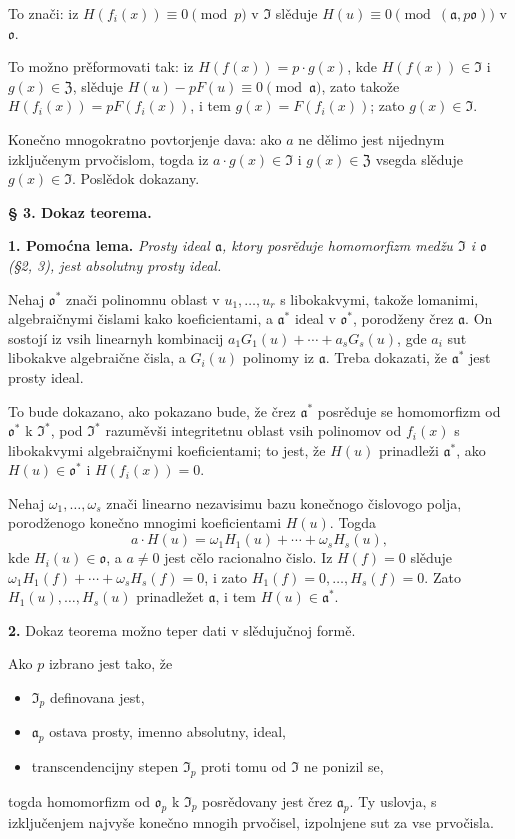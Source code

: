 \documentclass[11pt]{article}
\begin{document}
To znači: iz \(H(f_i(x))\equiv0\pmod p\) v \(\mathfrak{I}\) slěduje \(H(u)\equiv0\pmod{(\mathfrak{a},p\mathfrak{o})}\) v \(\mathfrak{o}\).

To možno prěformovati tak: iz \(H(f(x))=p\cdot g(x)\), kde \(H(f(x))\in\mathfrak{I}\) i \(g(x)\in\mathfrak{Z}\), slěduje \(H(u)-pF(u)\equiv0\pmod{\mathfrak{a}}\), zato takože \(H(f_i(x))=pF(f_i(x))\), i tem \(g(x)=F(f_i(x))\); zato \(g(x)\in\mathfrak{I}\).

Konečno mnogokratno povtorjenje dava: ako \(a\) ne dělimo jest nijednym izključenym prvočislom, togda iz \(a\cdot g(x)\in\mathfrak{I}\) i \(g(x)\in\mathfrak{Z}\) vsegda slěduje \(g(x)\in\mathfrak{I}\). Poslědok dokazany.

\bigskip
\noindent\textbf{§ 3. Dokaz teorema.}

\smallskip
\noindent\textbf{1. Pomoćna lema.}
\textit{Prosty ideal \(\mathfrak{a}\), ktory posrěduje homomorfizm medžu \(\mathfrak{I}\) i \(\mathfrak{o}\) (§2, 3), jest absolutny prosty ideal.}

Nehaj \(\mathfrak{o}^*\) znači polinomnu oblast v \(u_1,\ldots,u_r\) s libokakvymi, takože lomanimi, algebraičnymi čislami kako koeficientami, a \(\mathfrak{a}^*\) ideal v \(\mathfrak{o}^*\), porodženy črez \(\mathfrak{a}\). On sostojí iz vsih linearnyh kombinacij \(a_1G_1(u)+\cdots+a_sG_s(u)\), gde \(a_i\) sut libokakve algebraične čisla, a \(G_i(u)\) polinomy iz \(\mathfrak{a}\). Treba dokazati, že \(\mathfrak{a}^*\) jest prosty ideal.

To bude dokazano, ako pokazano bude, že črez \(\mathfrak{a}^*\) posrěduje se homomorfizm od \(\mathfrak{o}^*\) k \(\mathfrak{I}^*\), pod \(\mathfrak{I}^*\) razuměvši integritetnu oblast vsih polinomov od \(f_i(x)\) s libokakvymi algebraičnymi koeficientami; to jest, že \(H(u)\) prinadleži \(\mathfrak{a}^*\), ako \(H(u)\in\mathfrak{o}^*\) i \(H(f_i(x))=0\).

Nehaj \(\omega_1,\ldots,\omega_s\) znači linearno nezavisimu bazu konečnogo čislovogo polja, porodženogo konečno mnogimi koeficientami \(H(u)\). Togda
\[
a\cdot H(u)=\omega_1H_1(u)+\cdots+\omega_sH_s(u),
\]
kde \(H_i(u)\in\mathfrak{o}\), a \(a\ne0\) jest cělo racionalno čislo. Iz \(H(f)=0\) slěduje \(\omega_1H_1(f)+\cdots+\omega_sH_s(f)=0\), i zato \(H_1(f)=0,\ldots,H_s(f)=0\). Zato \(H_1(u),\ldots,H_s(u)\) prinadležet \(\mathfrak{a}\), i tem \(H(u)\in\mathfrak{a}^*\).

\medskip\noindent\textbf{2.}
Dokaz teorema možno teper dati v slědujučnoj formě.

Ako \(p\) izbrano jest tako, že
\begin{itemize}
\item[I.] \(\mathfrak{I}_p\) definovana jest,
\item[II.] \(\mathfrak{a}_p\) ostava prosty, imenno absolutny, ideal,
\item[III.] transcendencijny stepen \(\mathfrak{I}_p\) proti tomu od \(\mathfrak{I}\) ne ponizil se,
\end{itemize}
togda homomorfizm od \(\mathfrak{o}_p\) k \(\mathfrak{I}_p\) posrědovany jest črez \(\mathfrak{a}_p\). Ty uslovja, s izključenjem najvyše konečno mnogih prvočisel, izpolnjene sut za vse prvočisla.
\end{document}
